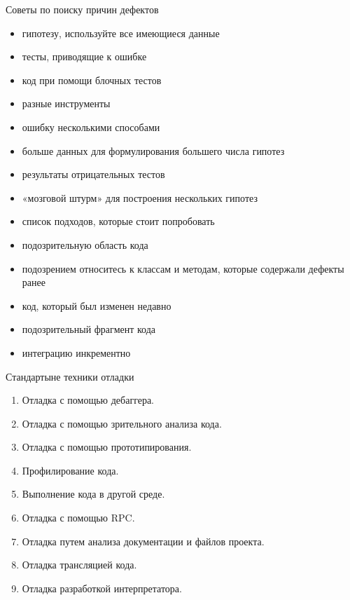 \documentclass[10pt,pdf,hyperref={unicode}]{beamer}%
\begin{document}
\begin{frame}{Советы по поиску причин дефектов}

  \begin{itemize}

    \item {  гипотезу,  используйте  все  имеющиеся  данные}
    \item { тесты, приводящие к ошибке}
    \item { код при помощи блочных тестов}
    \item {  разные  инструменты}
    \item {  ошибку  несколькими  способами}
    \item { больше данных для формулирования большего числа гипотез}
    \item {  результаты  отрицательных  тестов}
    \item {  «мозговой  штурм»  для  построения  нескольких  гипотез}
    \item {  список  подходов,  которые  стоит  попробовать}
    \item {  подозрительную  область  кода}
    \item {  подозрением  относитесь  к  классам  и  методам,  которые содержали дефекты ранее}
    \item {  код,  который  был  изменен  недавно}
    \item { подозрительный фрагмент кода}
    \item { интеграцию инкрементно}
  \end{itemize}

\end{frame}

\begin{frame}{Стандартыне техники отладки}

  \begin{enumerate}
  \item Отладка с помощью дебаггера.
  \item Отладка с помощью зрительного анализа кода.
  \item Отладка с помощью прототипирования.
  \item Профилирование кода.
  \item Выполнение кода в другой среде.
  \item Отладка с помощью RPC.
  \item Отладка путем анализа документации и файлов проекта.
  \item Отладка трансляцией кода.
  \item Отладка разработкой интерпретатора.
\end{enumerate}

\end{frame}
\end{document}
